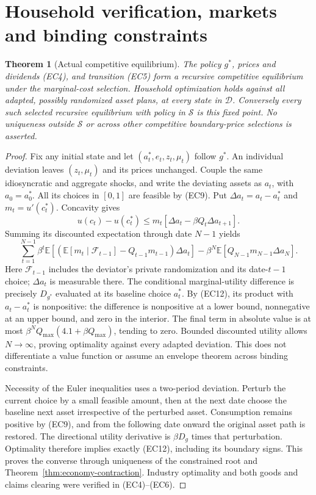 \documentclass[11pt,a4paper]{article}
\newtheorem{theorem}{Theorem}
\newcommand{\E}{\mathbb E}
\begin{document}
\section{Household verification, markets and binding constraints}
\begin{theorem}[Actual competitive equilibrium]\label{thm:actual-equilibrium}
The policy $g^*$, prices and dividends \textup{(EC4)}, and transition
\textup{(EC5)} form a recursive competitive equilibrium under the
marginal-cost selection. Household optimization holds against all adapted,
possibly randomized asset plans, at every state in $\mathcal D$.
Conversely every such selected recursive equilibrium with policy in
$\mathcal S$ is this fixed point. No uniqueness outside $\mathcal S$ or
across other competitive boundary-price selections is asserted.
\end{theorem}
\begin{proof}
Fix any initial state and let $(a_t^*,e_t,z_t,\mu_t)$ follow $g^*$.
An individual deviation leaves $(z_t,\mu_t)$ and its prices unchanged.
Couple the same idiosyncratic and aggregate shocks, and write the deviating
assets as $a_t$, with $a_0=a_0^*$. All its choices in $[0,1]$ are feasible
by \textup{(EC9)}. Put $\Delta a_t=a_t-a_t^*$ and
$m_t=u'(c_t^*)$. Concavity gives
\[
 u(c_t)-u(c_t^*)\leq m_t[\Delta a_t-\beta Q_t\Delta a_{t+1}].
 \tag{EC16}
\]
Summing its discounted expectation through date $N-1$ yields
\[
 \sum_{t=1}^{N-1}\beta^t
 \E[(\E[m_t\mid\mathcal F_{t-1}]-Q_{t-1}m_{t-1})\Delta a_t]
 -\beta^N\E[Q_{N-1}m_{N-1}\Delta a_N].
 \tag{EC17}
\]
Here $\mathcal F_{t-1}$ includes the deviator's private randomization and
its date-$t-1$ choice; $\Delta a_t$ is measurable there. The conditional
marginal-utility difference is precisely $D_{g^*}$ evaluated at its
baseline choice $a_t^*$. By \textup{(EC12)}, its product with
$a_t-a_t^*$ is nonpositive: the difference is nonpositive at a lower
bound, nonnegative at an upper bound, and zero in the interior.
The final term in absolute value is at most
$\beta^NQ_{\max}(4.1+\beta Q_{\max})$, tending to zero.
Bounded discounted utility allows $N\to\infty$, proving optimality
against every adapted deviation. This does not differentiate a value
function or assume an envelope theorem across binding constraints.

Necessity of the Euler inequalities uses a two-period deviation.
Perturb the current choice by a small feasible amount, then at the next
date choose the baseline next asset irrespective of the perturbed asset.
Consumption remains positive by \textup{(EC9)}, and from the following
date onward the original asset path is restored. The directional
utility derivative is $\beta D_g$ times that perturbation. Optimality
therefore implies exactly \textup{(EC12)}, including its boundary signs.
This proves the converse through uniqueness of the constrained root and
Theorem~\ref{thm:economy-contraction}. Industry optimality and both goods
and claims clearing were verified in \textup{(EC4)--(EC6)}.
\end{proof}
\end{document}
